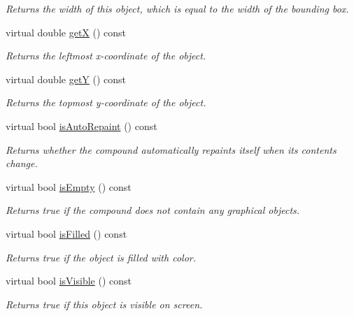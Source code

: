 \begin{DoxyCompactItemize}
\begin{DoxyCompactList}\small\item\em Returns the width of this object, which is equal to the width of the bounding box. \end{DoxyCompactList}\item 
virtual double \mbox{\hyperlink{classGObject_a344385751bee0720059403940d57a13e}{getX}} () const
\begin{DoxyCompactList}\small\item\em Returns the leftmost {\itshape x}-\/coordinate of the object. \end{DoxyCompactList}\item 
virtual double \mbox{\hyperlink{classGObject_aafa51c7f8f38a09febbb9ce7853f77b4}{getY}} () const
\begin{DoxyCompactList}\small\item\em Returns the topmost {\itshape y}-\/coordinate of the object. \end{DoxyCompactList}\item 
virtual bool \mbox{\hyperlink{classGCompound_a12c8d52ddfcaa5448ec4bace92ddee6c}{is\+Auto\+Repaint}} () const
\begin{DoxyCompactList}\small\item\em Returns whether the compound automatically repaints itself when its contents change. \end{DoxyCompactList}\item 
virtual bool \mbox{\hyperlink{classGCompound_acf82f9b2937375c7b1cf3dccb3df3312}{is\+Empty}} () const
\begin{DoxyCompactList}\small\item\em Returns true if the compound does not contain any graphical objects. \end{DoxyCompactList}\item 
virtual bool \mbox{\hyperlink{classGObject_a11c404f106940c201b6f326e0355c150}{is\+Filled}} () const
\begin{DoxyCompactList}\small\item\em Returns {\ttfamily true} if the object is filled with color. \end{DoxyCompactList}\item 
virtual bool \mbox{\hyperlink{classGObject_a9d8a6cfb13917785c143e74d40e4e2be}{is\+Visible}} () const
\begin{DoxyCompactList}\small\item\em Returns {\ttfamily true} if this object is visible on screen. \end{DoxyCompactList}\item 

\end{DoxyCompactItemize}
